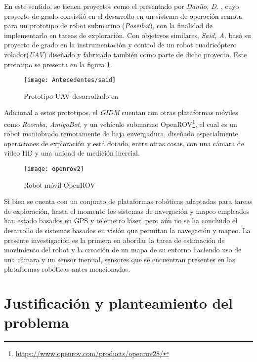  En este sentido, se tienen proyectos como el presentado por \textit{Danilo, D.} \cite{danilo}, cuyo proyecto de grado consistió en el desarrollo en un sistema de operación remota para un prototipo de robot submarino (\textit{Poseibot}), con la finalidad de implementarlo en tareas de exploración. Con objetivos similares, \textit{Said, A.} \cite{said} basó su proyecto de grado en la instrumentación y control de un robot cuadricóptero volador(\textit{UAV}) diseñado y fabricado también como parte de dicho proyecto. Este prototipo se presenta en la figura \ref{imagen:said}.
\begin{figure}[H]
	\centering
	\texttt{[image: Antecedentes/said]}
	\caption[Prototipo UAV desarrollado en  \cite{said}]{Prototipo UAV desarrollado en  \cite{said}}
	\label{imagen:said}
\end{figure}

Adicional a estos prototipos,  el \textit{GIDM} cuentan con otras plataformas móviles como \textit{Roomba}, \textit{AmigoBot}, y un vehículo submarino OpenROV\footnote{ \url{https://www.openrov.com/products/openrov28/}}, el cual es un robot maniobrado remotamente de baja envergadura, diseñado especialmente operaciones de exploración y está dotado, entre otras cosas, con una cámara de video HD y una unidad de medición inercial.

\begin{figure}[H]
	\centering
	\texttt{[image: openrov2]}
	\caption[Robot móvil OpenROV]{Robot móvil OpenROV}
	\label{imagen:openrov}
\end{figure}

Si bien se cuenta con un conjunto de plataformas robóticas adaptadas para tareas de exploración, hasta el momento los sistemas de navegación y mapeo empleados han estado basados en GPS y telémetro láser, pero aún no se ha concluido el desarrollo de sistemas basados en visión que permitan la navegación y mapeo. La presente investigación es la primera en abordar la tarea de estimación de movimiento del robot y la creación de un mapa de su entorno haciendo uso de una cámara y un sensor inercial, sensores que se encuentran presentes en las plataformas robóticas antes mencionadas.
\\
\section{Justificación y planteamiento del problema}

